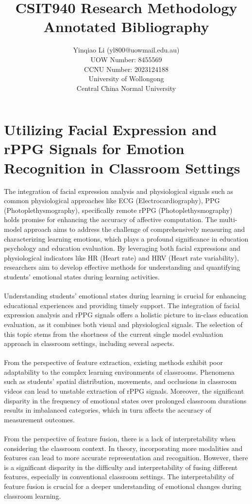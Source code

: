 \documentclass[11pt]{article}
\title{CSIT940 Research Methodology\\\medskip Annotated Bibliography}
\author{Yinqiao Li (yl800@uowmail.edu.au)
\\UOW Number: 8455569
\\CCNU Number: 2023124188
\\University of Wollongong
\\Central China Normal University}
\begin{document}
\maketitle

\justify
\section*{Utilizing Facial Expression and rPPG Signals for Emotion Recognition in Classroom Settings}

The integration of facial expression analysis and physiological signals such as common physiological approaches like ECG (Electrocardiography), PPG (Photoplethysmography), specifically remote rPPG (Photoplethysmography) holds promise for enhancing the accuracy of affective computation. The multi-model approach aims to address the challenge of comprehensively measuring and characterizing learning emotions, which plays a profound significance in education psychology and education evaluation. By leveraging both facial expressions and physiological indicators like HR (Heart rate) and HRV (Heart rate variability), researchers aim to develop effective methods for understanding and quantifying students' emotional states during learning activities.
\\
\\Understanding students’ emotional states during learning is crucial for enhancing educational experiences and providing timely support. The integration of facial expression analysis and rPPG signals offers a holistic picture to in-class education evaluation, as it combines both visual and physiological signals. The selection of this topic stems from the shortness of the current single model evaluation approach in classroom settings, including several aspects.
\\
\\From the perspective of feature extraction, existing methods exhibit poor adaptability to the complex learning environments of classrooms. Phenomena such as students’ spatial distribution, movements, and occlusions in classroom videos can lead to unstable extraction of rPPG signals. Moreover, the significant disparity in the frequency of emotional states over prolonged classroom durations results in imbalanced categories, which in turn affects the accuracy of measurement outcomes.
\\
\\From the perspective of feature fusion, there is a lack of interpretability when considering the classroom context. In theory, incorporating more modalities and features can lead to more accurate representation and recognition. However, there is a significant disparity in the difficulty and interpretability of fusing different features, especially in conventional classroom settings. The interpretability of feature fusion is crucial for a deeper understanding of emotional changes during classroom learning.
\end{document}
